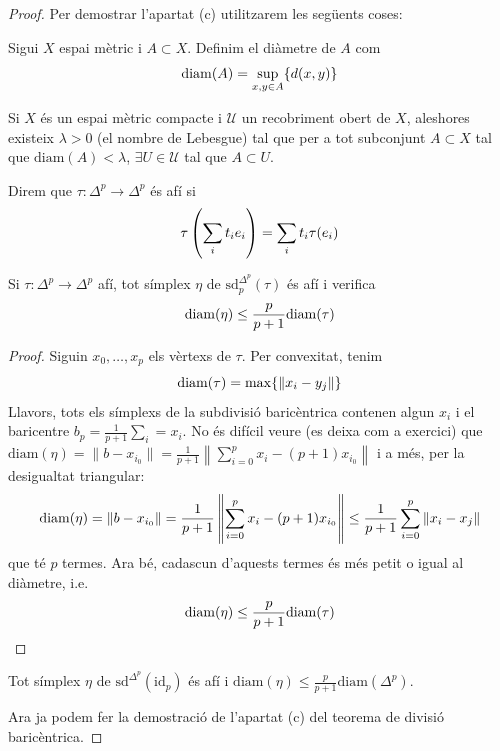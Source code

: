 \documentclass[../main.tex]{subfiles}
\begin{document}
\begin{enumerate}
\begin{proof}
    Per demostrar l'apartat (c) utilitzarem les següents coses:
    \begin{defi}
    Sigui $X$ espai mètric i $A\subset X$. Definim el diàmetre de $A$ com
    \begin{equation}
    \notag
    \mathrm{diam}(A) = \sup_{x,y\in A}\{d(x,y)\}
    \end{equation}
    \end{defi}
    \begin{lema}
    \label{lema:nombredelebesgue} Si $X$ és un espai mètric compacte i $\mathcal{U}$ un recobriment obert de $X$, aleshores existeix $\lambda>0$ (el nombre de Lebesgue) tal que per a tot subconjunt $A\subset X$ tal que $\mathrm{diam}(A)<\lambda$, $\exists U\in \mathcal{U}$ tal  que $A\subset U$.
    \end{lema}
    \begin{defi}
    Direm que $\tau:\Delta^p\rightarrow \Delta^p$ és afí si 
    \begin{equation}
    \notag
    \tau\left(\sum_i t_ie_i\right) = \sum_i t_i\tau(e_i)
    \end{equation}
    \end{defi}
    \begin{lema}
    Si $\tau:\Delta^p\rightarrow \Delta^p$ afí, tot símplex $\eta$ de $\mathrm{sd}_p^{\Delta^p}(\tau)$ és afí i verifica
    \begin{equation}
    \notag
    \mathrm{diam}(\eta) \leq \frac{p}{p+1}\mathrm{diam}(\tau)
    \end{equation}
    \end{lema}
    \begin{proof}
    Siguin $x_0,\ldots,x_p$ els vèrtexs de $\tau$. Per convexitat, tenim
    \begin{equation}
    \notag
    \mathrm{diam}(\tau) = \max\{\|x_i-y_j\|\}
    \end{equation}
    Llavors, tots els símplexs de la subdivisió baricèntrica contenen algun $x_i$ i el baricentre $b_p = \frac{1}{p+1}\sum_i = x_i$. No és difícil veure (es deixa com a exercici) que $\mathrm{diam}(\eta) = \|b-x_{i_0}\| = \frac{1}{p+1}\left\|\sum_{i=0}^px_i-(p+1)x_{i_0}\right\|$ i a més, per la desigualtat triangular:
    \begin{equation}
    \notag
    \mathrm{diam}(\eta) = \|b-x_{i_0}\| = \frac{1}{p+1}\left\|\sum_{i=0}^px_i-(p+1)x_{i_0}\right\|\leq \frac{1}{p+1}\sum_{i=0}^p\|x_i-x_j\|
    \end{equation}
    que té $p$ termes. Ara bé, cadascun d'aquests termes és més petit o igual al diàmetre, i.e.
    \begin{equation}
    \notag
    \mathrm{diam}(\eta)\leq \frac{p}{p+1}\mathrm{diam}(\tau)
    \end{equation}
    \end{proof}
    \begin{coro}
    Tot símplex $\eta$ de $\mathrm{sd}^{\Delta^p}(\mathrm{id}_p)$ és afí i $\mathrm{diam}(\eta)\leq\frac{p}{p+1}\mathrm{diam}(\Delta^p)$.
    \end{coro}
    Ara ja podem fer la demostració de l'apartat (c) del teorema de divisió baricèntrica.



\end{proof}
\end{enumerate}
\end{document}

